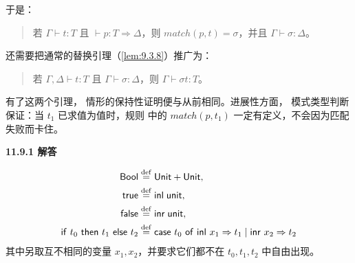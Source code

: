 \begin{taplauthorsolutionentrybox}
于是：

\begin{quote}
若 \(\Gamma\vdash t:T\) 且 \(\vdash p:T\Rightarrow\Delta\)，则
\(\mathit{match}(p,t)=\sigma\)，并且 \(\Gamma\vdash\sigma:\Delta\)。
\end{quote}

还需要把通常的替换引理（\cref{lem:9.3.8}）推广为：

\begin{quote}
若 \(\Gamma,\Delta\vdash t:T\) 且 \(\Gamma\vdash\sigma:\Delta\)，则
\(\Gamma\vdash\sigma t:T\)。
\end{quote}

有了这两个引理， 情形的保持性证明便与从前相同。进展性方面，
模式类型判断保证：当 \(t_1\) 已求值为值时，规则  中的
\(\mathit{match}(p,t_1)\) 一定有定义，不会因为匹配失败而卡住。

\end{taplauthorsolutionentrybox}

\begin{taplauthorsolutionentrybox}
\label{sol:author:11.9.1}
\textbf{11.9.1 解答}

\[
\begin{aligned}
\mathsf{Bool} &\mathrel{\stackrel{\mathrm{def}}{=}}
  \mathsf{Unit}+\mathsf{Unit},\\
\mathsf{true} &\mathrel{\stackrel{\mathrm{def}}{=}} \mathsf{inl}\;\mathsf{unit},\\
\mathsf{false} &\mathrel{\stackrel{\mathrm{def}}{=}} \mathsf{inr}\;\mathsf{unit},\\
\mathsf{if}\ t_0\ \mathsf{then}\ t_1\ \mathsf{else}\ t_2
  &\mathrel{\stackrel{\mathrm{def}}{=}}
    \mathsf{case}\ t_0\ \mathsf{of}\
      \mathsf{inl}\ x_1\Rightarrow t_1
      \mid
      \mathsf{inr}\ x_2\Rightarrow t_2
\end{aligned}
\]
其中另取互不相同的变量 \(x_1,x_2\)，并要求它们都不在
\(t_0,t_1,t_2\) 中自由出现。

\end{taplauthorsolutionentrybox}

